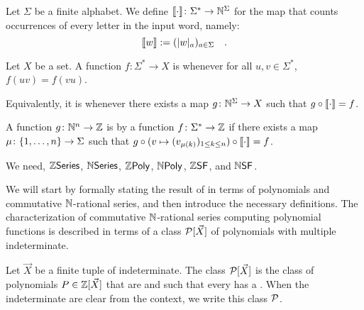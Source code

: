 \documentclass[a4paper,11pt]{article}
\begin{document}
\begin{definition}
    \label{commutative-map:def}
    Let $\Sigma$ be a finite alphabet. We define
    $\commute \colon \Sigma^* \to \Nat^\Sigma$ for the
    map that counts occurrences of every letter in the input word, namely:
    \begin{equation*}
        \commute[w] \defined \seqof{\card[a]{w}}{a \in \Sigma} \quad .
    \end{equation*}
\end{definition}

\begin{definition}
    \label{commutative:def}
    Let $X$ be a set.
    A function $f \colon \Sigma^* \to X$ is
     whenever
    for all $u,v \in \Sigma^*$, $f(uv) = f(vu)$.

    Equivalently, it is  whenever
    there exists a map $g \colon \mathbb{N}^\Sigma \to X$
    such that $g \circ \commute = f$.
\end{definition}


\begin{definition}
    A function $g \colon \mathbb{N}^n \to \mathbb{Z}$
    is  by a function $f \colon \Sigma^* \to \mathbb{Z}$
    if there exists a map $\mu \colon \mathopen{\{} 1, \dots, n \mathclose{\}} \to \Sigma$
    such that
    $g \circ (v \mapsto \seqof{v_{\mu(k)}}{1 \leq k \leq n}) \circ \commute = f$.
\end{definition}



We need, $\mathbb{Z}\mathsf{Series}$, $\mathbb{N}\mathsf{Series}$, $\ZPoly$, $\NPoly$, $\ZSF$, and $\NSF$.


We will start by formally stating the result of \citeauthor{KARH77}
in terms of polynomials and commutative $\mathbb{N}$-rational series, and
then introduce the necessary definitions. The characterization of
commutative $\mathbb{N}$-rational series computing polynomial functions
is described in terms of a class $\mathcal{P}[\vec{X}]$ of
polynomials with multiple indeterminate.

\begin{definition}
    Let $\vec{X}$ be a finite tuple of indeterminate.
    The class $\mathcal{P}[\vec{X}]$
    is the class of polynomials $P \in \mathbb{Z}[\vec{X}]$
    that are 
    and such that every  has a .
    When the indeterminate are clear from the context, we write
    this class $\mathcal{P}$.
\end{definition}
\end{document}
